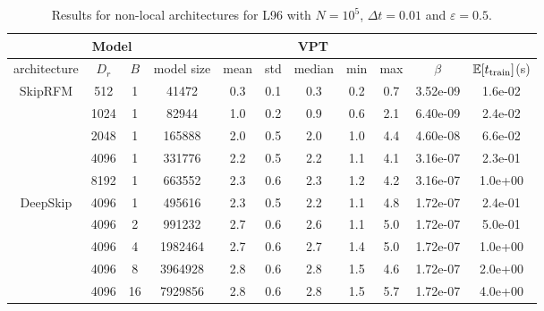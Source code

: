 \begin{table}[!htp]
    \centering
    \begin{tabular}{|c|c|c|c|c|c|c|c|c|c|c|} \hline
\multicolumn{4}{|c|}{Model} &\multicolumn{5}{c|}{VPT} & \multicolumn{2}{c|}{}\\ \hline
architecture & $D_r$ & $B$ & model size & mean & std & median & min & max &$\beta$ & $\mathbb{E}[t_{\rm train}]$(s)\\ \hline\hline
\multirow{5}{*}{SkipRFM} & 512 & 1 & 41472 & 0.3 & 0.1 & 0.3 & 0.2 & 0.7 & 3.52e-09 & 1.6e-02\\ \cline{2-11}
 & 1024 & 1 & 82944 & 1.0 & 0.2 & 0.9 & 0.6 & 2.1 & 6.40e-09 & 2.4e-02\\ \cline{2-11}
 & 2048 & 1 & 165888 & 2.0 & 0.5 & 2.0 & 1.0 & 4.4 & 4.60e-08 & 6.6e-02\\ \cline{2-11}
 & 4096 & 1 & 331776 & 2.2 & 0.5 & 2.2 & 1.1 & 4.1 & 3.16e-07 & 2.3e-01\\ \cline{2-11}
 & \cellcolor{pink}8192 & \cellcolor{pink}1 & \cellcolor{pink}663552 & \cellcolor{pink}2.3 & \cellcolor{pink}0.6 & \cellcolor{pink}2.3 & \cellcolor{pink}1.2 & \cellcolor{pink}4.2 & \cellcolor{pink}3.16e-07 & \cellcolor{pink}1.0e+00\\ \cline{2-11}
\hline\hline
\multirow{5}{*}{DeepSkip} & 4096 & 1 & 495616 & 2.3 & 0.5 & 2.2 & 1.1 & 4.8 & 1.72e-07 & 2.4e-01\\ \cline{2-11}
 & 4096 & 2 & 991232 & 2.7 & 0.6 & 2.6 & 1.1 & 5.0 & 1.72e-07 & 5.0e-01\\ \cline{2-11}
 & 4096 & 4 & 1982464 & 2.7 & 0.6 & 2.7 & 1.4 & 5.0 & 1.72e-07 & 1.0e+00\\ \cline{2-11}
 & 4096 & 8 & 3964928 & 2.8 & 0.6 & 2.8 & 1.5 & 4.6 & 1.72e-07 & 2.0e+00\\ \cline{2-11}
 & \cellcolor{pink}4096 & \cellcolor{pink}16 & \cellcolor{pink}7929856 & \cellcolor{pink}2.8 & \cellcolor{pink}0.6 & \cellcolor{pink}2.8 & \cellcolor{pink}1.5 & \cellcolor{pink}5.7 & \cellcolor{pink}1.72e-07 & \cellcolor{pink}4.0e+00\\ \cline{2-11}
\cline{1-2}
\end{tabular}
\caption{Results for non-local architectures for L96 with $N=10^5$, $\Delta t=0.01$ and $\varepsilon=0.5$.}
    \label{tab:L96_1_s}
\end{table}


